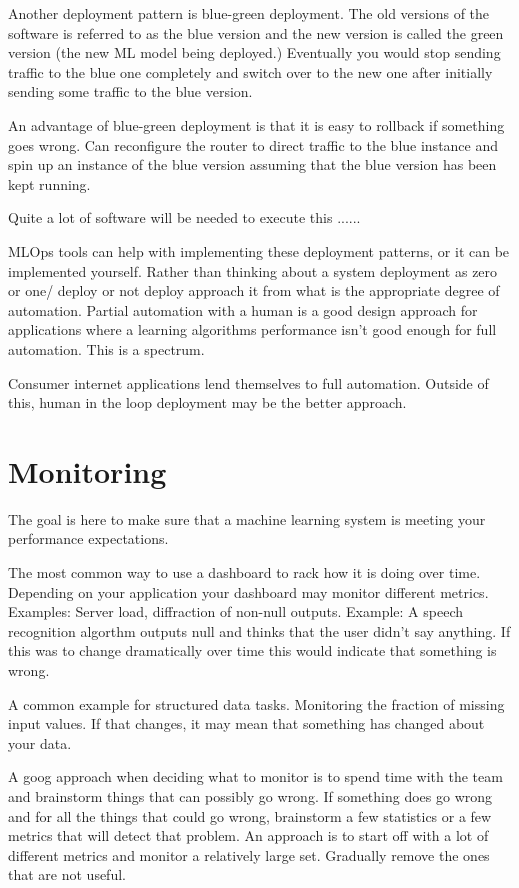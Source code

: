 Another deployment pattern is blue-green deployment.
The old versions of the software is referred to as the blue version and the new version is called the green version (the new ML model being deployed.)
Eventually you would stop sending traffic to the blue one completely and switch over to the new one after initially sending some traffic to the blue version.

An advantage of blue-green deployment is that it is easy to rollback if something goes wrong.
Can reconfigure the router to direct traffic to the blue instance and spin up an instance of the blue version assuming that the blue version has been kept running.

Quite a lot of software will be needed to execute this ......

MLOps tools can help with implementing these deployment patterns, or it can be implemented yourself.
Rather than thinking about a system deployment as zero or one/ deploy or not deploy approach it from what is the appropriate degree of automation.
Partial automation with a human is a good design approach for applications where a learning algorithms performance isn't good enough for full automation.
This is a spectrum.

Consumer internet applications lend themselves to full automation.
Outside of this, human in the loop deployment may be the better approach.

\section{Monitoring}

The goal is here to make sure that a machine learning system is meeting your performance expectations.

The most common way to use a dashboard to rack how it is doing over time.
Depending on your application your dashboard may monitor different metrics.
Examples: Server load, diffraction of non-null outputs.
Example:  A speech recognition algorthm outputs null and thinks that the user didn't say anything.
If this was to change dramatically over time this would indicate that something is wrong.

A common example for structured data tasks.
Monitoring the fraction of missing input values.
If that changes, it may mean that something has changed about your data.

A goog approach when deciding what to monitor is to spend time with the team and brainstorm things that can possibly go wrong.
If something does go wrong and for all the things that could go wrong, brainstorm a few statistics or a few metrics that will detect that problem.
An approach is to start off with a lot of different metrics and monitor a relatively large set.
Gradually remove the ones that are not useful.

